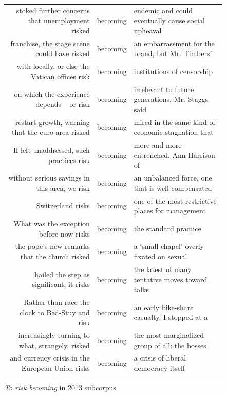     \begin{figure}
    \footnotesize
    \begin{tabular}{rcl}
    stoked further concerns that unemployment risked &  becoming &  endemic and could eventually cause social upheaval  \\ 
    franchise, the stage scene could have risked &  becoming &  an embarrassment for the brand, but Mr. Timbers'   \\ 
    with locally, or else the Vatican offices risk &  becoming &  institutions of censorship   \\ 
    on which the experience depends -- or risk &  becoming &  irrelevant to future generations, Mr. Staggs said   \\ 
    restart growth, warning that the euro area risked &  becoming &  mired in the same kind of economic stagnation that   \\ 
    If left unaddressed, such practices risk &  becoming &  more and more entrenched, Ann Harrison of   \\ 
    without serious savings in this area, we risk &  becoming &  an unbalanced force, one that is well compensated   \\ 
    Switzerland risks &  becoming &  one of the most restrictive places for management   \\ 
    What was the exception before now risks &  becoming &  the standard practice   \\ 
    the pope's new remarks that the church risked &  becoming &  a `small chapel' overly fixated on sexual   \\ 
    hailed the step as significant, it risks &  becoming &  the latest of many tentative moves toward talks   \\ 
    Rather than race the clock to Bed-Stuy and risk &  becoming &  an early bike-share casualty, I stopped at a   \\ 
    increasingly turning to what, strangely, risked &  becoming &  the most marginalized group of all: the bosses   \\ 
    and currency crisis in the European Union risks &  becoming &  a crisis of liberal democracy itself \\ 
    \end{tabular}
    \caption{\emph{To risk becoming} in 2013 subcorpus}
    \end{figure}
    


